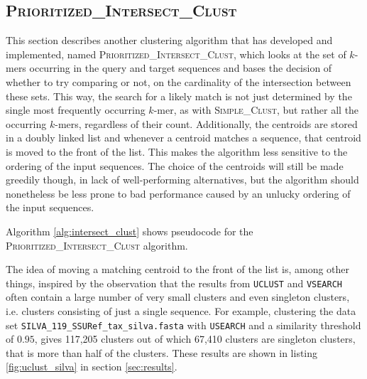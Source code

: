 \subsection{\textsc{Prioritized\_Intersect\_Clust}}

This section describes another clustering algorithm that has developed and
implemented, named \textsc{Prioritized\_Intersect\_Clust}, which looks at the
set of $k$-mers occurring in the query and target sequences and bases the
decision of whether to try comparing or not, on the cardinality of the
intersection between these sets. This way, the search for a likely match is not
just determined by the single most frequently occurring $k$-mer, as with
\textsc{Simple\_Clust}, but rather all the occurring $k$-mers, regardless of
their count. Additionally, the centroids are stored in a doubly linked list and
whenever a centroid matches a sequence, that centroid is moved to the front of
the list. This makes the algorithm less sensitive to the ordering of the input
sequences. The choice of the centroids will still be made greedily though, in
lack of well-performing alternatives, but the algorithm should nonetheless be
less prone to bad performance caused by an unlucky ordering of the input
sequences.

Algorithm \ref{alg:intersect_clust} shows pseudocode for the
\textsc{Prioritized\_Intersect\_Clust} algorithm.

The idea of moving a matching centroid to the front of the list is, among other
things, inspired by the observation that the results from \texttt{UCLUST} and
\texttt{VSEARCH} often contain a large number of very small clusters and even
singleton clusters, i.e. clusters consisting of just a single sequence. For
example, clustering the data set \texttt{SILVA\_119\_SSURef\_tax\_silva.fasta}
with \texttt{USEARCH} and a similarity threshold of $0.95$, gives 117,205
clusters out of which 67,410 clusters are singleton clusters, that is more than
half of the clusters. These results are shown in listing \ref{fig:uclust_silva}
in section \ref{sec:results}.

